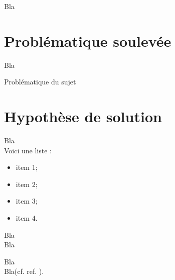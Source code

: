 Bla

\newpage

\section{Problématique soulevée}

Bla

\begin{center}
Problématique du sujet
\end{center}

\section{Hypothèse de solution}

Bla\\

Voici une liste :
\begin{itemize}
\item item 1;
\item item 2;
\item item 3;
\item item 4.
\end{itemize}

Bla\\

Bla

Bla\footnotemark\\

Bla(cf. ref. \cite{cite6}).



